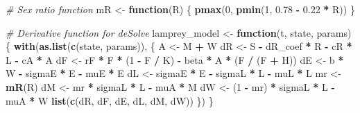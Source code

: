 \documentclass[
]{article}
\newenvironment{Shaded}{\begin{snugshade}}{\end{snugshade}}
\newcommand{\CommentTok}[1]{\textcolor[rgb]{0.56,0.35,0.01}{\textit{#1}}}
\newcommand{\ControlFlowTok}[1]{\textcolor[rgb]{0.13,0.29,0.53}{\textbf{#1}}}
\newcommand{\DecValTok}[1]{\textcolor[rgb]{0.00,0.00,0.81}{#1}}
\newcommand{\FloatTok}[1]{\textcolor[rgb]{0.00,0.00,0.81}{#1}}
\newcommand{\FunctionTok}[1]{\textcolor[rgb]{0.13,0.29,0.53}{\textbf{#1}}}
\newcommand{\NormalTok}[1]{#1}
\newcommand{\OtherTok}[1]{\textcolor[rgb]{0.56,0.35,0.01}{#1}}
\newcommand{\SpecialCharTok}[1]{\textcolor[rgb]{0.81,0.36,0.00}{\textbf{#1}}}
\begin{document}
\begin{Shaded}
\begin{Highlighting}[]
\CommentTok{\# Sex ratio function}
\NormalTok{mR }\OtherTok{\textless{}{-}} \ControlFlowTok{function}\NormalTok{(R) \{}
  \FunctionTok{pmax}\NormalTok{(}\DecValTok{0}\NormalTok{, }\FunctionTok{pmin}\NormalTok{(}\DecValTok{1}\NormalTok{, }\FloatTok{0.78} \SpecialCharTok{{-}} \FloatTok{0.22} \SpecialCharTok{*}\NormalTok{ R))}
\NormalTok{\}}

\CommentTok{\# Derivative function for deSolve}
\NormalTok{lamprey\_model }\OtherTok{\textless{}{-}} \ControlFlowTok{function}\NormalTok{(t, state, params) \{}
  \FunctionTok{with}\NormalTok{(}\FunctionTok{as.list}\NormalTok{(}\FunctionTok{c}\NormalTok{(state, params)), \{}
\NormalTok{    A }\OtherTok{\textless{}{-}}\NormalTok{ M }\SpecialCharTok{+}\NormalTok{ W}
\NormalTok{    dR }\OtherTok{\textless{}{-}}\NormalTok{ S }\SpecialCharTok{{-}}\NormalTok{ dR\_coef }\SpecialCharTok{*}\NormalTok{ R }\SpecialCharTok{{-}}\NormalTok{ cR }\SpecialCharTok{*}\NormalTok{ L }\SpecialCharTok{{-}}\NormalTok{ cA }\SpecialCharTok{*}\NormalTok{ A}
\NormalTok{    dF }\OtherTok{\textless{}{-}}\NormalTok{ rF }\SpecialCharTok{*}\NormalTok{ F }\SpecialCharTok{*}\NormalTok{ (}\DecValTok{1} \SpecialCharTok{{-}}\NormalTok{ F }\SpecialCharTok{/}\NormalTok{ K) }\SpecialCharTok{{-}}\NormalTok{ beta }\SpecialCharTok{*}\NormalTok{ A }\SpecialCharTok{*}\NormalTok{ (F }\SpecialCharTok{/}\NormalTok{ (F }\SpecialCharTok{+}\NormalTok{ H))}
\NormalTok{    dE }\OtherTok{\textless{}{-}}\NormalTok{ b }\SpecialCharTok{*}\NormalTok{ W }\SpecialCharTok{{-}}\NormalTok{ sigmaE }\SpecialCharTok{*}\NormalTok{ E }\SpecialCharTok{{-}}\NormalTok{ muE }\SpecialCharTok{*}\NormalTok{ E}
\NormalTok{    dL }\OtherTok{\textless{}{-}}\NormalTok{ sigmaE }\SpecialCharTok{*}\NormalTok{ E }\SpecialCharTok{{-}}\NormalTok{ sigmaL }\SpecialCharTok{*}\NormalTok{ L }\SpecialCharTok{{-}}\NormalTok{ muL }\SpecialCharTok{*}\NormalTok{ L}
\NormalTok{    mr }\OtherTok{\textless{}{-}} \FunctionTok{mR}\NormalTok{(R)}
\NormalTok{    dM }\OtherTok{\textless{}{-}}\NormalTok{ mr }\SpecialCharTok{*}\NormalTok{ sigmaL }\SpecialCharTok{*}\NormalTok{ L }\SpecialCharTok{{-}}\NormalTok{ muA }\SpecialCharTok{*}\NormalTok{ M}
\NormalTok{    dW }\OtherTok{\textless{}{-}}\NormalTok{ (}\DecValTok{1} \SpecialCharTok{{-}}\NormalTok{ mr) }\SpecialCharTok{*}\NormalTok{ sigmaL }\SpecialCharTok{*}\NormalTok{ L }\SpecialCharTok{{-}}\NormalTok{ muA }\SpecialCharTok{*}\NormalTok{ W}
    \FunctionTok{list}\NormalTok{(}\FunctionTok{c}\NormalTok{(dR, dF, dE, dL, dM, dW))}
\NormalTok{  \})}
\NormalTok{\}}


\end{Highlighting}
\end{Shaded}
\end{document}
